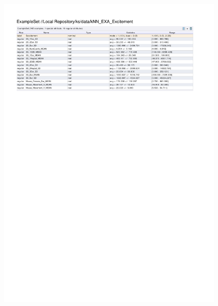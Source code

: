 \begin{figure}[htp]
  \centerline{\includegraphics[trim=0 570 0 60,clip,width=16.09cm]{results/kNN_EXA_Excitement.pdf}} \caption{
} \label{kNN_K_Excitement}
\end{figure}

